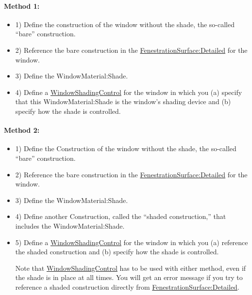 \paragraph{Method 1:}\label{method-1}

\begin{itemize}

\item 1) Define the construction of the window without the shade, the so-called ``bare'' construction.

\item 2) Reference the bare construction in the \hyperref[fenestrationsurfacedetailed]{FenestrationSurface:Detailed} for the window.

\item 3) Define the WindowMaterial:Shade.

\item 4) Define a \hyperref[windowpropertyshadingcontrol]{WindowShadingControl} for the window in which you (a) specify that this WindowMaterial:Shade is the window's shading device and (b) specify how the shade is controlled.

\end{itemize}

\paragraph{Method 2:}\label{method-2}

\begin{itemize}

\item 1) Define the Construction of the window without the shade, the so-called ``bare'' construction.

\item 2) Reference the bare construction in the \hyperref[fenestrationsurfacedetailed]{FenestrationSurface:Detailed} for the window.

\item 3) Define the WindowMaterial:Shade.

\item 4) Define another Construction, called the ``shaded construction,'' that includes the WindowMaterial:Shade.

\item 5) Define a \hyperref[windowpropertyshadingcontrol]{WindowShadingControl} for the window in which you (a) reference the shaded construction and (b) specify how the shade is controlled.

Note that \hyperref[windowpropertyshadingcontrol]{WindowShadingControl} has to be used with either method, even if the shade is in place at all times. You will get an error message if you try to reference a shaded construction directly from \hyperref[fenestrationsurfacedetailed]{FenestrationSurface:Detailed}.

\end{itemize}

